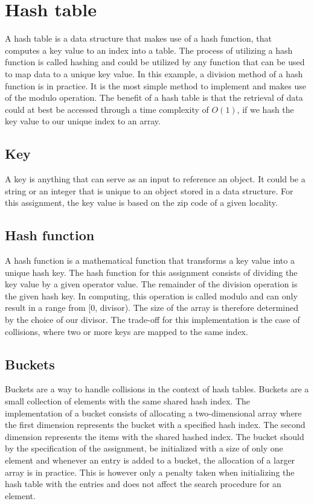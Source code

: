 \documentclass[a4paper,11pt]{article}
\begin{document}
\section*{Hash table}

    A hash table is a data structure that makes use of a hash function, that computes a key value to an index into a table. The process of utilizing a hash function is called hashing and could be utilized by any function that can be used to map data to a unique key value. In this example, a division method of a hash function is in practice. It is the most simple method to implement and makes use of the modulo operation. The benefit of a hash table is that the retrieval of data could at best be accessed through a time complexity of $O(1)$, if we hash the key value to our unique index to an array.

    \subsection*{Key}

        A key is anything that can serve as an input to reference an object. It could be a string or an integer that is unique to an object stored in a data structure. For this assignment, the key value is based on the zip code of a given locality.
    
    \subsection*{Hash function}

        A hash function is a mathematical function that transforms a key value into a unique hash key. The hash function for this assignment consists of dividing the key value by a given operator value. The remainder of the division operation is the given hash key. In computing, this operation is called modulo and can only result in a range from [0, divisor). The size of the array is therefore determined by the choice of our divisor. The trade-off for this implementation is the case of collisions, where two or more keys are mapped to the same index.

    \subsection*{Buckets}

        Buckets are a way to handle collisions in the context of hash tables. Buckets are a small collection of elements with the same shared hash index. The implementation of a bucket consists of allocating a two-dimensional array where the first dimension represents the bucket with a specified hash index. The second dimension represents the items with the shared hashed index. The bucket should by the specification of the assignment, be initialized with a size of only one element and whenever an entry is added to a bucket, the allocation of a larger array is in practice. This is however only a penalty taken when initializing the hash table with the entries and does not affect the search procedure for an element.
\end{document}

